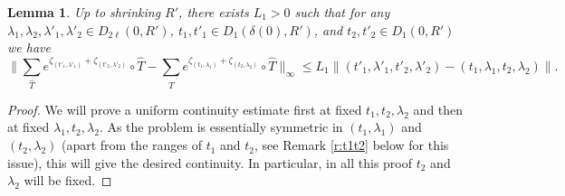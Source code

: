 \documentclass[11pt]{amsart}
\theoremstyle{plain}
\newtheorem{lem}[thm]{Lemma}
\theoremstyle{definition}
\theoremstyle{remark}
\begin{document}
\begin{lem}\label{l:314a}
Up to shrinking $R'$,
there exists $L_1 > 0$
such that for any $\lambda_1,\lambda_2,\lambda'_1, \lambda'_2 
\in D_{2\ell}(0,R')$,
$t_1,t'_1 \in D_1(\delta(0),R')$, and 
$t_2,t'_2\in D_1(0,R')$
we have
$$\Big\|\sum_{\hat T} e^{
\zeta_{(t'_1,\lambda'_1)}
+
\zeta_{(t'_2,\lambda'_2)}
}\circ \hat{T} - \sum_{\hat T} e^{\zeta_{(t_1,\lambda_1)}
+
\zeta_{(t_2,\lambda_2)}
}\circ \hat{T}\Big\|_\infty \le L_1\|(t'_1,\lambda'_1, t'_2, \lambda'_2)
-(t_1,\lambda_1, t_2, \lambda_2)\|.$$
\end{lem}

\begin{proof}
We will prove a uniform continuity estimate first at fixed $t_1, t_2, \lambda_2$ and then at fixed $\lambda_1, t_2, \lambda_2$.
As the problem is essentially
symmetric
in $(t_1, \lambda_1)$ and $(t_2, \lambda_2)$
(apart from the ranges of $t_1$ and $t_2$,
see Remark \ref{r:t1t2} below for this issue),
this will give the desired continuity. In particular, in all this proof $t_2$ and $\lambda_2$ will be fixed.

\medskip



\end{proof}
\end{document}
